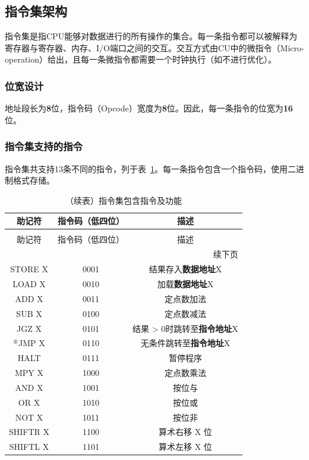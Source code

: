 \documentclass[lang=cn,a4paper,newtx]{elegantpaper}
\begin{document}
\subsection{指令集架构}
指令集是指CPU能够对数据进行的所有操作的集合。每一条指令都可以被解释为寄存器与寄存器、内存、I/O端口之间的交互。交互方式由CU中的微指令（Micro-operation）给出，且每一条微指令都需要一个时钟执行（如不进行优化）。
\subsubsection{位宽设计}
地址段长为\textbf{8}位，指令码（Opcode）宽度为\textbf{8}位。因此，每一条指令的位宽为\textbf{16}位。


\subsubsection{指令集支持的指令}
指令集共支持13条不同的指令，列于表~\ref{tab:ISA:instructions}。每一条指令包含一个指令码，使用二进制格式存储。
  


\begin{longtable}{c c c}
  \caption{指令集包含指令及功能} \label{tab:ISA:instructions} \\
  \toprule
  助记符  & 指令码（低四位） & 描述 \\
  \midrule
  \endfirsthead
  
  \caption[]{（续表）指令集包含指令及功能} \\
  \toprule
  助记符  & 指令码（低四位） & 描述 \\
  \midrule
  \endhead
  
  \midrule
  \multicolumn{3}{r}{续下页} \\
  \midrule
  \endfoot
  
  \bottomrule
  \endlastfoot
  
  STORE X &  0001   & 结果存入\textbf{数据地址}X \\
  LOAD X  & 0010    & 加载\textbf{数据地址}X \\
  ADD X   & 0011    & 定点数加法\\
  SUB X   & 0100  & 定点数减法\\
  JGZ X   & 0101    & 结果 > 0时跳转至\textbf{指令地址}X\\
  $^\circledast$JMP X   & 0110    & 无条件跳转至\textbf{指令地址}X\\
  HALT    & 0111    & 暂停程序\\
  MPY X   & 1000    & 定点数乘法 \\
  AND X   & 1001    & 按位与\\
  OR X    & 1010    & 按位或\\
  NOT X   & 1011    & 按位非 \\
  SHIFTR X & 1100    & 算术右移 X 位\\
  SHIFTL X & 1101    & 算术左移 X 位\\
\end{longtable}
\end{document}
